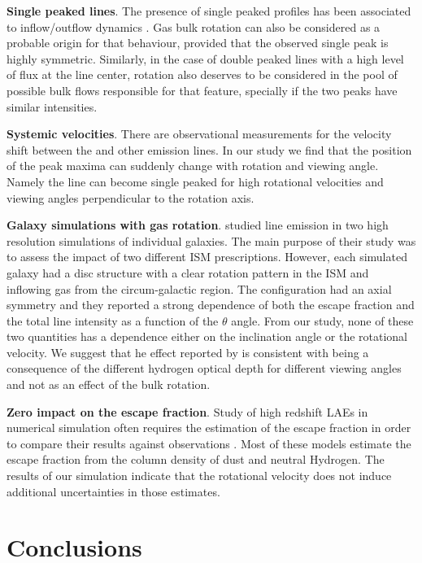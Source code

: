 \documentclass{emulateapj}
\newcommand{\ly}{{\ifmmode{{\rm Ly}\alpha~}\else{Ly$\alpha$~}\fi}}
\begin{document}
{\bf Single peaked lines}. The presence of single peaked profiles has
been associated to inflow/outflow dynamics
\citep{Verhamme06,DijkstraKramer}. 
Gas bulk rotation can also be considered as a probable origin for that
behaviour, provided that the observed single peak is highly
symmetric. 
Similarly, in the case of double peaked lines with a high
level of flux at the line center, rotation also deserves to be
considered in the pool of possible bulk flows responsible for that feature,
specially if the two peaks have similar intensities. 

{\bf Systemic velocities}. There are observational measurements for the
velocity shift between the \ly and other emission lines. In our study
we find that the position of the peak maxima can suddenly change with
rotation and viewing angle. Namely the line can become single peaked
for high rotational velocities and viewing angles perpendicular to the
rotation axis. 


{\bf Galaxy simulations with gas rotation}. \cite{Verhamme12} studied \ly
line emission in two high resolution simulations of individual
galaxies. 
The main purpose of their study was to assess the impact of two
different ISM prescriptions. 
However, each simulated galaxy had a disc structure with a clear rotation pattern in
the ISM and inflowing gas from the circum-galactic region. 
The configuration had an axial symmetry and they reported a strong dependence of both
the escape fraction and the total line intensity as a function of the
$\theta$ angle. 
From our study, none of these two quantities has a dependence either
on the inclination angle or the rotational velocity. 
We suggest that he effect reported by \cite{Verhamme12} is
consistent with being a consequence of the different hydrogen optical
depth for different viewing angles and not as an effect of the bulk
rotation.


{\bf Zero impact on the \ly escape fraction}. Study of
high redshift LAEs in numerical simulation often requires the
estimation of the \ly escape fraction in order to compare their
results against observations
\citep{CLARA,Dayal2012,Forero12,Orsi12,Garel2012}. Most of these
models estimate the escape fraction from the column density of dust and
neutral Hydrogen. The results of our simulation indicate that the
rotational velocity does not induce additional uncertainties in those
estimates.


\section{Conclusions}
\label{sec:conclusions}
\end{document}

